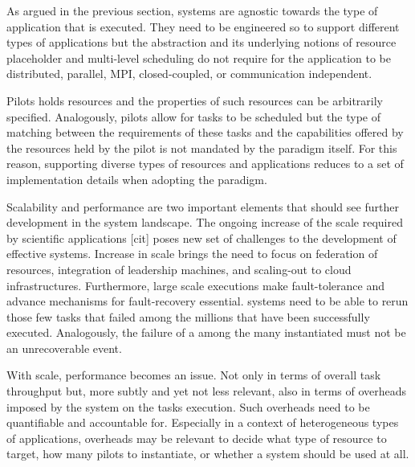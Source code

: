\documentclass{sig-alternate}
\begin{document}
As argued in the previous section, \pilot systems are agnostic towards the type
of application that is executed. They need to be engineered so to support
different types of applications but the \pilot abstraction and its underlying
notions of resource placeholder and multi-level scheduling do not require for
the application to be distributed, parallel, MPI, closed-coupled, or
communication independent.

Pilots holds resources and the properties of such resources can be arbitrarily
specified. Analogously, pilots allow for tasks to be scheduled but the type of
matching between the requirements of these tasks and the capabilities offered
by the resources held by the pilot is not mandated by the \pilot paradigm
itself. For this reason, supporting diverse types of resources and applications
reduces to a set of implementation details when adopting the \pilot paradigm.



Scalability and performance are two important elements that should see further
development in the \pilot system landscape. The ongoing increase of the scale
required by scientific applications [cit] poses new set of challenges to the
development of effective \pilot systems. Increase in scale brings the need to
focus on federation of resources, integration of leadership machines, and
scaling-out to cloud infrastructures. Furthermore, large scale executions make
fault-tolerance and advance mechanisms for fault-recovery essential. \pilot
systems need to be able to rerun those few tasks that failed among the millions
that have been successfully executed. Analogously, the failure of a \pilot
among the many instantiated must not be an unrecoverable event.

With scale, performance becomes an issue. Not only in terms of overall task
throughput but, more subtly and yet not less relevant, also in terms of
overheads imposed by the \pilot system on the tasks execution. Such overheads
need to be quantifiable and accountable for. Especially in a context of
heterogeneous types of applications, \pilot overheads may be relevant to decide
what type of resource to target, how many pilots to instantiate, or whether a
\pilot system should be used at all.
\end{document}
